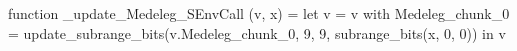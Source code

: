 function _update_Medeleg_SEnvCall (v, x) = let v = { v with Medeleg_chunk_0 = update_subrange_bits(v.Medeleg_chunk_0, 9, 9, subrange_bits(x, 0, 0)) } in
  v
